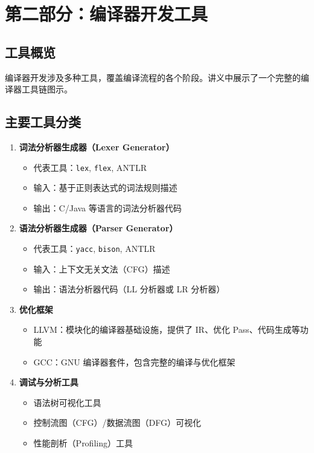 \documentclass[12pt,a4paper]{ctexart}
\begin{document}
\newpage

\section{第二部分：编译器开发工具}

\subsection{工具概览}

编译器开发涉及多种工具，覆盖编译流程的各个阶段。讲义中展示了一个完整的编译器工具链图示。

\subsection{主要工具分类}

\begin{enumerate}[itemsep=0.3em]
  \item \textbf{词法分析器生成器（Lexer Generator）}
  \begin{itemize}
    \item 代表工具：\texttt{lex}, \texttt{flex}, ANTLR
    \item 输入：基于正则表达式的词法规则描述
    \item 输出：C/Java 等语言的词法分析器代码
  \end{itemize}

  \item \textbf{语法分析器生成器（Parser Generator）}
  \begin{itemize}
    \item 代表工具：\texttt{yacc}, \texttt{bison}, ANTLR
    \item 输入：上下文无关文法（CFG）描述
    \item 输出：语法分析器代码（LL 分析器或 LR 分析器）
  \end{itemize}

  \item \textbf{优化框架}
  \begin{itemize}
    \item LLVM：模块化的编译器基础设施，提供了 IR、优化 Pass、代码生成等功能
    \item GCC：GNU 编译器套件，包含完整的编译与优化框架
  \end{itemize}

  \item \textbf{调试与分析工具}
  \begin{itemize}
    \item 语法树可视化工具
    \item 控制流图（CFG）/数据流图（DFG）可视化
    \item 性能剖析（Profiling）工具
  \end{itemize}
\end{enumerate}
\end{document}
